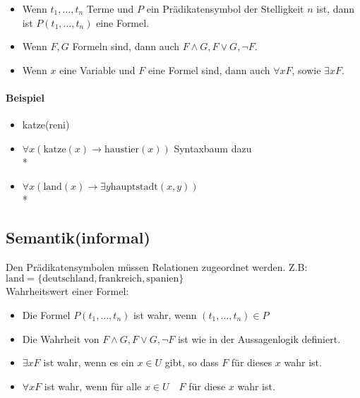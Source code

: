 \documentclass[a4paper]{scrartcl}
\begin{document}
\begin{itemize}
\item Wenn $t_1,\dots,t_n$ Terme und $P$ ein Prädikatensymbol der Stelligkeit $n$ ist, dann ist $P(t_1,\dots,t_n)$ eine Formel.
\item Wenn $F,G$ Formeln sind, dann auch $F \wedge G, F\vee G, \neg F$.
\item Wenn $x$ eine Variable und $F$ eine Formel sind, dann auch $\forall x F$, sowie $\exists x F$.
\end{itemize}
\paragraph{Beispiel}
\begin{itemize}
\item katze(reni)
\item $\forall x (\text{katze}(x) \rightarrow \text{haustier}(x)) $
Syntaxbaum dazu \\* 
\item $\forall x(\text{land}(x) \rightarrow \exists y \text{hauptstadt}(x,y))$ \\*
\end{itemize}

\subsection{Semantik(informal)} Den Prädikatensymbolen müssen Relationen zugeordnet werden. Z.B: $\text{land} = \{\text{deutschland},\text{frankreich},\text{spanien}\}$\\
Wahrheitswert einer Formel:
\begin{itemize}
\item Die Formel $P(t_1,\dots,t_n)$ ist wahr, wenn $(t_1,\dots,t_n) \in P$
\item Die Wahrheit von $F \wedge G, F \vee G, \neg F$ ist wie in der Aussagenlogik definiert.
\item $\exists xF$ ist wahr, wenn es ein $x \in U$ gibt, so dass $F$ für dieses $x$ wahr ist.
\item $\forall xF$ ist wahr, wenn für alle $x \in U \quad F$ für diese $x$ wahr ist.
\end{itemize}
\end{document}
